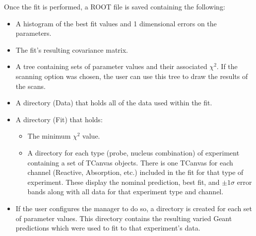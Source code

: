 \documentclass[12pt]{article}
\begin{document}
Once the fit is performed, a ROOT file is saved containing the following:
\begin{itemize}
	\item A histogram of the best fit values and 1 dimensional errors on the parameters.
	\item The fit's resulting covariance matrix.
	\item A tree containing sets of parameter values and their associated $\chi^2$. If the scanning option was chosen, the user can use this tree to draw the results of the scans.
	\item A directory (Data) that holds all of the data used within the fit.
	\item A directory (Fit) that holds:
	\begin{itemize}
		\item The minimum $\chi^2$ value.
		\item A directory for each type (probe, nucleus combination) of experiment containing a set of TCanvas objects. There is one TCanvas for each channel (Reactive, Absorption, etc.) included in the fit for that type of experiment. These display the nominal prediction, best fit, and $\pm 1\sigma$ error bands along with all  data for that experiment type and channel.
	\end{itemize}
    \item If the user configures the manager to do so, a directory is created for each set of parameter values. This directory contains the resulting varied Geant predictions which were used to fit to that experiment's data.
\end{itemize}
\end{document}
